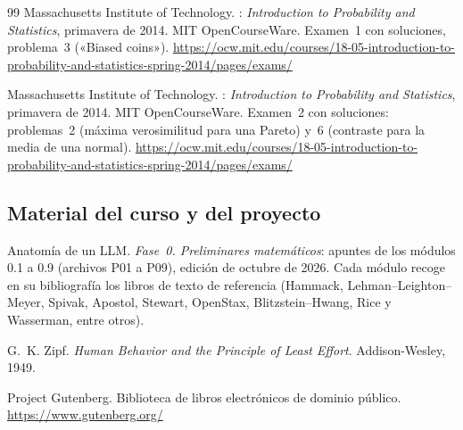 \begin{thebibliography}{99}
Massachusetts Institute of Technology.
: \emph{Introduction to Probability and Statistics}, primavera de 2014. MIT OpenCourseWare.
\newblock Examen~1 con soluciones, problema~3 («Biased coins»).
\newblock \url{https://ocw.mit.edu/courses/18-05-introduction-to-probability-and-statistics-spring-2014/pages/exams/}

Massachusetts Institute of Technology.
: \emph{Introduction to Probability and Statistics}, primavera de 2014. MIT OpenCourseWare.
\newblock Examen~2 con soluciones: problemas~2 (máxima verosimilitud para una Pareto) y~6 (contraste para la media de una normal).
\newblock \url{https://ocw.mit.edu/courses/18-05-introduction-to-probability-and-statistics-spring-2014/pages/exams/}

\subsection*{Material del curso y del proyecto}

Anatomía de un LLM.
\newblock \emph{Fase~0. Preliminares matemáticos}: apuntes de los módulos 0.1 a 0.9 (archivos P01 a P09), edición de octubre de 2026.
\newblock Cada módulo recoge en su bibliografía los libros de texto de referencia (Hammack, Lehman--Leighton--Meyer, Spivak, Apostol, Stewart, OpenStax, Blitzstein--Hwang, Rice y Wasserman, entre otros).

G.~K. Zipf.
\newblock \emph{Human Behavior and the Principle of Least Effort}.
\newblock Addison-Wesley, 1949.

Project Gutenberg.
\newblock Biblioteca de libros electrónicos de dominio público.
\newblock \url{https://www.gutenberg.org/}

\end{thebibliography}
